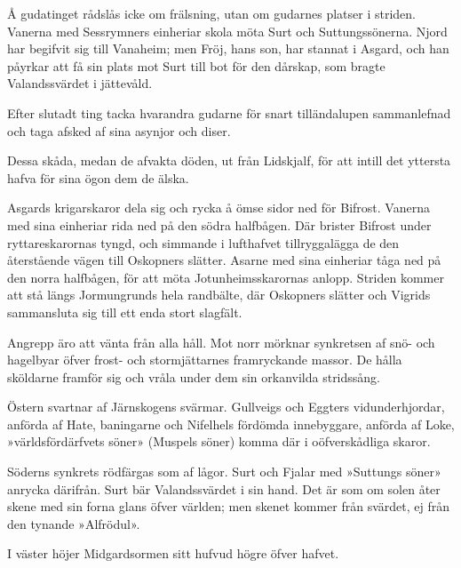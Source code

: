 Å gudatinget rådslås icke om frälsning, utan om gudarnes platser i
striden. Vanerna med Sessrymners einheriar skola möta Surt och
Suttungssönerna. Njord har begifvit sig till Vanaheim; men Fröj, hans
son, har stannat i Asgard, och han påyrkar att få sin plats mot Surt
till bot för den dårskap, som bragte Valandssvärdet i jättevåld.

\protect\hypertarget{lb1625905.xhtmlux5cux23start194}{}{}\protect\hypertarget{lb1625905.xhtmlux5cux23start194-a}{}{}\protect\hypertarget{lb1625905.xhtmlux5cux23start194-b}{}{}\protect\hypertarget{lb1625905.xhtmlux5cux23start194-c}{}{}\protect\hypertarget{lb1625905.xhtmlux5cux23start194-d}{}{}

Efter slutadt ting tacka hvarandra gudarne för snart tilländalupen
sammanlefnad och taga afsked af sina asynjor och diser.

Dessa skåda, medan de afvakta döden, ut från Lidskjalf, för att intill
det yttersta hafva för sina ögon dem de älska.

Asgards krigarskaror dela sig och rycka å ömse sidor ned för Bifrost.
Vanerna med sina einheriar rida ned på den södra halfbågen. Där brister
Bifrost under ryttareskarornas tyngd, och simmande i lufthafvet
tillryggalägga de den återstående vägen till Oskopners slätter. Asarne
med sina einheriar tåga ned på den norra halfbågen, för att möta
Jotunheimsskarornas anlopp. Striden kommer att stå längs Jormungrunds
hela randbälte, där Oskopners slätter och Vigrids sammansluta sig till
ett enda stort slagfält.

Angrepp äro att vänta från alla håll. Mot norr mörknar synkretsen af
snö- och hagelbyar öfver frost- och stormjättarnes framryckande massor.
De hålla sköldarne framför sig och vråla under dem sin orkanvilda
stridssång.

Östern svartnar af Järnskogens svärmar. Gullveigs och Eggters
vidunderhjordar, anförda af Hate, baningarne och Nifelhels fördömda
innebyggare, anförda af Loke, »världsfördärfvets söner» (Muspels söner)
komma där i oöfverskådliga skaror.

Söderns synkrets rödfärgas som af lågor. Surt och Fjalar med »Suttungs
söner» anrycka därifrån. Surt bär Valandssvärdet i sin hand. Det är som
om solen åter skene med sin forna glans öfver världen; men skenet kommer
från svärdet, ej från den tynande »Alfrödul».

I väster höjer Midgardsormen sitt hufvud högre öfver hafvet.

